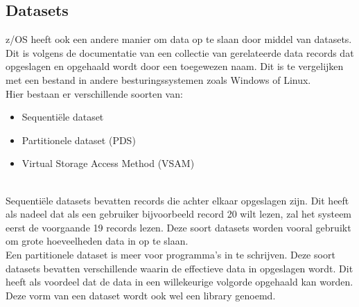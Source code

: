 \subsection{Datasets}
z/OS heeft ook een andere manier om data op te slaan door middel van datasets. Dit is volgens de documentatie van \textcite{IBM} een collectie van gerelateerde data records dat opgeslagen en opgehaald wordt door een toegewezen naam. Dit is te vergelijken met een bestand in andere besturingssystemen zoals Windows of Linux. \\

Hier bestaan er verschillende soorten van:

\begin{itemize}
    \item Sequentiële dataset
    \item Partitionele dataset (PDS)
    \item Virtual Storage Access Method (VSAM)
\end{itemize} \\

Sequentiële datasets bevatten records die achter elkaar opgeslagen zijn. Dit heeft als nadeel dat als een gebruiker bijvoorbeeld record 20 wilt lezen, zal het systeem eerst de voorgaande 19 records lezen. Deze soort datasets worden vooral gebruikt om grote hoeveelheden data in op te slaan. \autocite{IBM} \\

Een partitionele dataset is meer voor programma's in te schrijven. Deze soort datasets bevatten verschillende  waarin de effectieve data in opgeslagen wordt. Dit heeft als voordeel dat de data in een willekeurige volgorde opgehaald kan worden. Deze vorm van een dataset wordt ook wel een library genoemd. \autocite{IBM} \\

